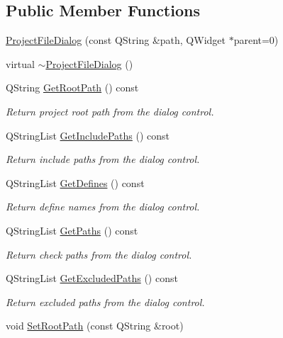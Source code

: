 \subsection*{Public Member Functions}
\begin{DoxyCompactItemize}
\item 
\hyperlink{class_project_file_dialog_a9347f7c17d7c79219a596ef8c11f76ad}{Project\-File\-Dialog} (const Q\-String \&path, Q\-Widget $\ast$parent=0)
\item 
virtual \hyperlink{class_project_file_dialog_a71a5262ed94599e62a15c11167f0e532}{$\sim$\-Project\-File\-Dialog} ()
\item 
Q\-String \hyperlink{class_project_file_dialog_a125dff1d8e9f1a1fa8ec9fd943cce4c4}{Get\-Root\-Path} () const 
\begin{DoxyCompactList}\small\item\em Return project root path from the dialog control. \end{DoxyCompactList}\item 
Q\-String\-List \hyperlink{class_project_file_dialog_a404c4401634da08824d4feab2bece2f9}{Get\-Include\-Paths} () const 
\begin{DoxyCompactList}\small\item\em Return include paths from the dialog control. \end{DoxyCompactList}\item 
Q\-String\-List \hyperlink{class_project_file_dialog_a6ade921e61b1c7a90afa5adc8f9eb53c}{Get\-Defines} () const 
\begin{DoxyCompactList}\small\item\em Return define names from the dialog control. \end{DoxyCompactList}\item 
Q\-String\-List \hyperlink{class_project_file_dialog_aca0df76d9242e65d6b41f4aff5c45165}{Get\-Paths} () const 
\begin{DoxyCompactList}\small\item\em Return check paths from the dialog control. \end{DoxyCompactList}\item 
Q\-String\-List \hyperlink{class_project_file_dialog_acd0d190acbbed426fcfcdba8d549f72f}{Get\-Excluded\-Paths} () const 
\begin{DoxyCompactList}\small\item\em Return excluded paths from the dialog control. \end{DoxyCompactList}\item 
void \hyperlink{class_project_file_dialog_a6c20077aabf4f2d86308d598f4a22b6a}{Set\-Root\-Path} (const Q\-String \&root)

\end{DoxyCompactItemize}
